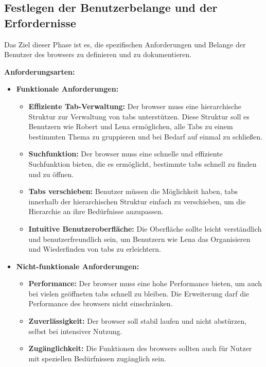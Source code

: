 \subsection{Festlegen der Benutzerbelange und der Erfordernisse}

Das Ziel dieser Phase ist es, die spezifischen Anforderungen und Belange der Benutzer des \gls{browser}s zu definieren und zu dokumentieren. 

\textbf{Anforderungsarten:}
\begin{itemize}
    \item \textbf{Funktionale Anforderungen:}
    \begin{itemize}
        \item \textbf{Effiziente Tab-Verwaltung:} Der \gls{browser} muss eine hierarchische Struktur zur Verwaltung von \gls{tab}s unterstützen. Diese Struktur soll es Benutzern wie Robert und Lena ermöglichen, alle Tabs zu einem bestimmten Thema zu gruppieren und bei Bedarf auf einmal zu schließen.
        \item \textbf{Suchfunktion:} Der \gls{browser} muss eine schnelle und effiziente Suchfunktion bieten, die es ermöglicht, bestimmte \gls{tab}s schnell zu finden und zu öffnen.
        \item \textbf{Tabs verschieben:} Benutzer müssen die Möglichkeit haben, \gls{tab}s innerhalb der hierarchischen Struktur einfach zu verschieben, um die Hierarchie an ihre Bedürfnisse anzupassen.
        \item \textbf{Intuitive Benutzeroberfläche:} Die Oberfläche sollte leicht verständlich und benutzerfreundlich sein, um Benutzern wie Lena das Organisieren und Wiederfinden von \gls{tab}s zu erleichtern.
    \end{itemize}
    \item \textbf{Nicht-funktionale Anforderungen:}
    \begin{itemize}
        \item \textbf{Performance:} Der \gls{browser} muss eine hohe Performance bieten, um auch bei vielen geöffneten \gls{tab}s schnell zu bleiben. Die Erweiterung darf die Performance des \gls{browser}s nicht einschränken.
        \item \textbf{Zuverlässigkeit:} Der \gls{browser} soll stabil laufen und nicht abstürzen, selbst bei intensiver Nutzung.
        \item \textbf{Zugänglichkeit:} Die Funktionen des \gls{browser}s sollten auch für Nutzer mit speziellen Bedürfnissen zugänglich sein.
    \end{itemize}
\end{itemize}

